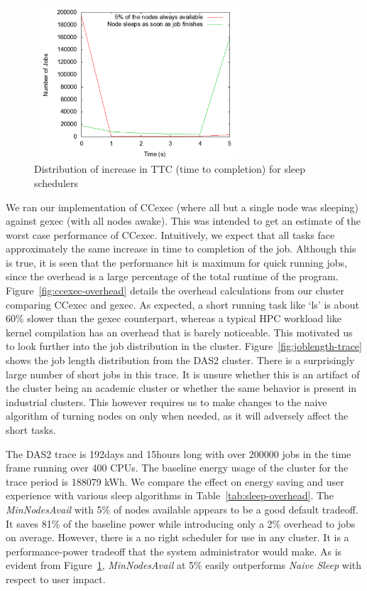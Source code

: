 \begin{figure}[ht]
\centering
\begin{center}
\includegraphics[width=3.0in]{graphs/overhead-time.pdf}
\vspace{-0.1in}
\caption{{\normalsize Distribution of increase in TTC (time to completion) for sleep schedulers}\label{fig:overhead-time}}
\vspace{-0.1in}
\end{center}
\end{figure}
We ran our implementation of CCexec (where all but a single node was sleeping) against gexec (with all nodes awake). This was intended to get an estimate of the worst case performance of CCexec. Intuitively, we expect that all tasks face approximately the same increase in time to completion of the job. Although this is true, it is seen that the performance hit is maximum for quick running jobs, since the overhead is a large percentage of the total runtime of the program. Figure~\ref{fig:ccexec-overhead} details the overhead calculations from our cluster comparing CCexec and gexec. As expected, a short running task like `ls' is about 60\% slower than the gexec counterpart, whereas a typical HPC workload like kernel compilation has an overhead that is barely noticeable. This motivated us to look further into the job distribution in the cluster. Figure~\ref{fig:joblength-trace} shows the job length distribution from the DAS2 cluster. There is a surprisingly large number of short jobs in this trace. It is unsure whether this is an artifact of the cluster being an academic cluster or whether the same behavior is present in industrial clusters. This however requires us to make changes to the naive algorithm of turning nodes on only when needed, as it will adversely affect the short tasks.

The DAS2 trace is 192days and 15hours long with over 200000 jobs in the time frame running over 400 CPUs. The baseline energy usage of the cluster for the trace period is 188079 kWh. We compare the effect on energy saving and user experience with various sleep algorithms in Table~\ref{tab:sleep-overhead}. The \emph{MinNodesAvail} with 5\% of nodes available appears to be a good default tradeoff. It saves 81\% of the baseline power while introducing only a 2\% overhead to jobs on average. However, there is a no right scheduler for use in any cluster. It is a performance-power tradeoff that the system administrator would make. As is evident from Figure~\ref{fig:overhead-time}, \emph{MinNodesAvail} at 5\% easily outperforms \emph{Naive Sleep} with respect to user impact.

